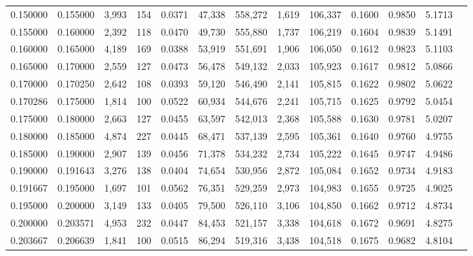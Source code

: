 \begin{tabular}{rrrrrrrrrrrrr}
0.150000 & 0.155000 & 3,993 & 154 &                                     0.0371 &  47,338 & 558,272 &   1,619 & 106,337 & 0.1600 & 0.9850 & 5.1713 \\
0.155000 & 0.160000 & 2,392 & 118 &                                     0.0470 &  49,730 & 555,880 &   1,737 & 106,219 & 0.1604 & 0.9839 & 5.1491 \\
0.160000 & 0.165000 & 4,189 & 169 &                                     0.0388 &  53,919 & 551,691 &   1,906 & 106,050 & 0.1612 & 0.9823 & 5.1103 \\
0.165000 & 0.170000 & 2,559 & 127 &                                     0.0473 &  56,478 & 549,132 &   2,033 & 105,923 & 0.1617 & 0.9812 & 5.0866 \\
0.170000 & 0.170250 & 2,642 & 108 &                                     0.0393 &  59,120 & 546,490 &   2,141 & 105,815 & 0.1622 & 0.9802 & 5.0622 \\
0.170286 & 0.175000 & 1,814 & 100 &                                     0.0522 &  60,934 & 544,676 &   2,241 & 105,715 & 0.1625 & 0.9792 & 5.0454 \\
0.175000 & 0.180000 & 2,663 & 127 &                                     0.0455 &  63,597 & 542,013 &   2,368 & 105,588 & 0.1630 & 0.9781 & 5.0207 \\
0.180000 & 0.185000 & 4,874 & 227 &                                     0.0445 &  68,471 & 537,139 &   2,595 & 105,361 & 0.1640 & 0.9760 & 4.9755 \\
0.185000 & 0.190000 & 2,907 & 139 &                                     0.0456 &  71,378 & 534,232 &   2,734 & 105,222 & 0.1645 & 0.9747 & 4.9486 \\
0.190000 & 0.191643 & 3,276 & 138 &                                     0.0404 &  74,654 & 530,956 &   2,872 & 105,084 & 0.1652 & 0.9734 & 4.9183 \\
0.191667 & 0.195000 & 1,697 & 101 &                                     0.0562 &  76,351 & 529,259 &   2,973 & 104,983 & 0.1655 & 0.9725 & 4.9025 \\
0.195000 & 0.200000 & 3,149 & 133 &                                     0.0405 &  79,500 & 526,110 &   3,106 & 104,850 & 0.1662 & 0.9712 & 4.8734 \\
0.200000 & 0.203571 & 4,953 & 232 &                                     0.0447 &  84,453 & 521,157 &   3,338 & 104,618 & 0.1672 & 0.9691 & 4.8275 \\
0.203667 & 0.206639 & 1,841 & 100 &                                     0.0515 &  86,294 & 519,316 &   3,438 & 104,518 & 0.1675 & 0.9682 & 4.8104 \\

\end{tabular}

